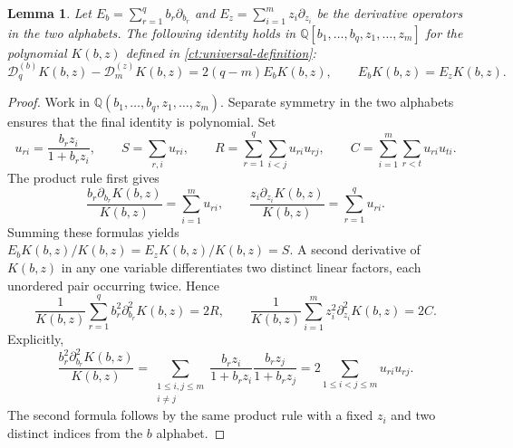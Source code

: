 \documentclass[reqno, 12pt]{article}
\numberwithin{equation}{section}
\newtheorem{lemma}[theorem]{Lemma}
\theoremstyle{definition}
\begin{document}
\begin{lemma}\label{ct:kernel-identity}
Let $E_b=\sum_{r=1}^qb_r\partial_{b_r}$ and
$E_z=\sum_{i=1}^mz_i\partial_{z_i}$ be the derivative
operators in the two alphabets.  The following identity holds in
$\mathbb Q[b_1,\ldots,b_q,z_1,\ldots,z_m]$ for the polynomial
$K(b,z)$ defined in \eqref{ct:universal-definition}:
\begin{equation}\label{ct:kernel-intertwining}
 \mathcal D_q^{(b)}K(b,z)-\mathcal D_m^{(z)}K(b,z)=2(q-m)E_bK(b,z),\qquad E_bK(b,z)=E_zK(b,z).
\end{equation}
\end{lemma}
\begin{proof}
Work in $\mathbb Q(b_1,\ldots,b_q,z_1,\ldots,z_m)$.
Separate symmetry in the two alphabets ensures that the final
identity is polynomial.  Set
\[
 u_{ri}=\frac{b_rz_i}{1+b_rz_i},\qquad
 S=\sum_{r,i}u_{ri},\qquad
 R=\sum_{r=1}^q\sum_{i<j}u_{ri}u_{rj},\qquad
 C=\sum_{i=1}^m\sum_{r<t}u_{ri}u_{ti}.
\]
The product rule first gives
\[
 \frac{b_r\partial_{b_r}K(b,z)}{K(b,z)}=\sum_{i=1}^m u_{ri},
 \qquad
 \frac{z_i\partial_{z_i}K(b,z)}{K(b,z)}=\sum_{r=1}^q u_{ri}.
\]
Summing these formulas yields $E_bK(b,z)/K(b,z)=E_zK(b,z)/K(b,z)=S$.
A second derivative of $K(b,z)$ in any one variable differentiates two
distinct linear factors, each unordered pair occurring twice.  Hence
\begin{equation}\label{ct:kernel-second-derivatives}
\frac{1}{K(b,z)}\sum_{r=1}^q b_r^2\partial_{b_r}^2K(b,z)=2R,
 \qquad
 \frac{1}{K(b,z)}\sum_{i=1}^m z_i^2\partial_{z_i}^2K(b,z)=2C.
\end{equation}
Explicitly,
\[
 \frac{b_r^2\partial_{b_r}^2K(b,z)}{K(b,z)}
 =\sum_{\substack{1\leq i,j\leq m\\i\ne j}}
    \frac{b_rz_i}{1+b_rz_i}\frac{b_rz_j}{1+b_rz_j}
 =2\sum_{1\leq i<j\leq m}u_{ri}u_{rj}.
\]
The second formula follows by the same product rule with a fixed
$z_i$ and two distinct indices from the $b$ alphabet.


\end{proof}
\end{document}
